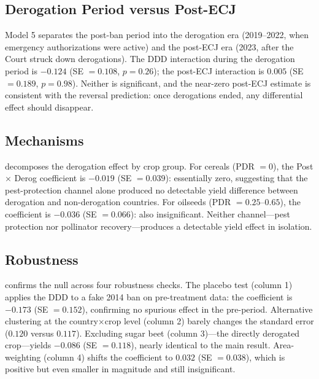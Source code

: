 \documentclass[12pt]{article}
\begin{document}
\subsection{Derogation Period versus Post-ECJ}

Model 5 separates the post-ban period into the derogation era (2019--2022, when emergency authorizations were active) and the post-ECJ era (2023, after the Court struck down derogations). The DDD interaction during the derogation period is $-0.124$ (SE $= 0.108$, $p = 0.26$); the post-ECJ interaction is $0.005$ (SE $= 0.189$, $p = 0.98$). Neither is significant, and the near-zero post-ECJ estimate is consistent with the reversal prediction: once derogations ended, any differential effect should disappear.

\subsection{Mechanisms}



 decomposes the derogation effect by crop group. For cereals (PDR $= 0$), the Post $\times$ Derog coefficient is $-0.019$ (SE $= 0.039$): essentially zero, suggesting that the pest-protection channel alone produced no detectable yield difference between derogation and non-derogation countries. For oilseeds (PDR $= 0.25$--$0.65$), the coefficient is $-0.036$ (SE $= 0.066$): also insignificant. Neither channel---pest protection nor pollinator recovery---produces a detectable yield effect in isolation.

\subsection{Robustness}



 confirms the null across four robustness checks. The placebo test (column 1) applies the DDD to a fake 2014 ban on pre-treatment data: the coefficient is $-0.173$ (SE $= 0.152$), confirming no spurious effect in the pre-period. Alternative clustering at the country$\times$crop level (column 2) barely changes the standard error ($0.120$ versus $0.117$). Excluding sugar beet (column 3)---the directly derogated crop---yields $-0.086$ (SE $= 0.118$), nearly identical to the main result. Area-weighting (column 4) shifts the coefficient to $0.032$ (SE $= 0.038$), which is positive but even smaller in magnitude and still insignificant.
\end{document}
